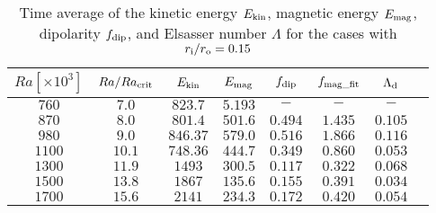 \begin{table}
 \begin{center}
\caption{Time average of the kinetic energy $E_{\rm kin}$, magnetic energy $E_{\rm mag}$, dipolarity $f_{\rm dip}$, and Elsasser number $\Lambda$ for the cases with $r_{\rm i}/r_{\rm o} = 0.15$}
  \begin{tabular}{cccccccc}
      \hline
     $Ra[\times 10^3]$  &  $Ra/Ra_{\rm crit}$&  $E_{\rm kin}$  &  $E_{\rm mag}$ & $f_{\rm dip}$ & $f_{\rm mag\_fit}$ & $\Lambda_{\rm d}$\\
    \hline \hline
    $760$  & $7.0$ &  $823.7$ & $5.193$ & $-$ & $-$ & $-$\\
    $870$  & $8.0$ &  $801.4$ & $501.6$ & $0.494$ & $1.435$ & $0.105$\\
    $980$  & $9.0$ &  $846.37$ & $579.0$ & $0.516$ & $1.866$ &$0.116$\\
    $1100$  & $10.1$ &  $748.36$ & $444.7$ & $0.349$ & $0.860$ & $0.053$\\
    $1300$  & $11.9$ &  $1493$ & $300.5$ & $0.117$ & $0.322$ & $0.068$\\
    $1500$  & $13.8$ &  $1867$ & $135.6$ & $0.155$ & $0.391$ & $0.034$\\
    $1700$  & $15.6$ &  $2141$ & $234.3$ & $0.172$ & $0.420$ & $0.054$\\
     \hline
  \end{tabular}
 \end{center}
 \label{table:Summary_15}
 \end{table}
 
